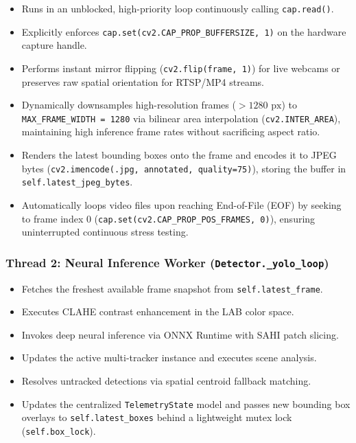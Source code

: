 \begin{itemize}
\tightlist
\item
  Runs in an unblocked, high-priority loop continuously calling
  \texttt{cap.read()}.
\item
  Explicitly enforces \texttt{cap.set(cv2.CAP\_PROP\_BUFFERSIZE,\ 1)} on
  the hardware capture handle.
\item
  Performs instant mirror flipping (\texttt{cv2.flip(frame,\ 1)}) for
  live webcams or preserves raw spatial orientation for RTSP/MP4
  streams.
\item
  Dynamically downsamples high-resolution frames (\(>1280\text{ px}\))
  to \texttt{MAX\_FRAME\_WIDTH\ =\ 1280} via bilinear area interpolation
  (\texttt{cv2.INTER\_AREA}), maintaining high inference frame rates
  without sacrificing aspect ratio.
\item
  Renders the latest bounding boxes onto the frame and encodes it to
  JPEG bytes
  (\texttt{cv2.imencode(\textquotesingle{}.jpg\textquotesingle{},\ annotated,\ quality=75)}),
  storing the buffer in \texttt{self.latest\_jpeg\_bytes}.
\item
  Automatically loops video files upon reaching End-of-File (EOF) by
  seeking to frame index 0
  (\texttt{cap.set(cv2.CAP\_PROP\_POS\_FRAMES,\ 0)}), ensuring
  uninterrupted continuous stress testing.
\end{itemize}

\subsubsection{\texorpdfstring{Thread 2: Neural Inference Worker
(\texttt{Detector.\_yolo\_loop})}{Thread 2: Neural Inference Worker (Detector.\_yolo\_loop)}}\label{thread-2-neural-inference-worker-detector._yolo_loop}

\begin{itemize}
\tightlist
\item
  Fetches the freshest available frame snapshot from
  \texttt{self.latest\_frame}.
\item
  Executes CLAHE contrast enhancement in the LAB color space.
\item
  Invokes deep neural inference via ONNX Runtime with SAHI patch
  slicing.
\item
  Updates the active multi-tracker instance and executes scene analysis.
\item
  Resolves untracked detections via spatial centroid fallback matching.
\item
  Updates the centralized \texttt{TelemetryState} model and passes new
  bounding box overlays to \texttt{self.latest\_boxes} behind a
  lightweight mutex lock (\texttt{self.box\_lock}).
\end{itemize}

